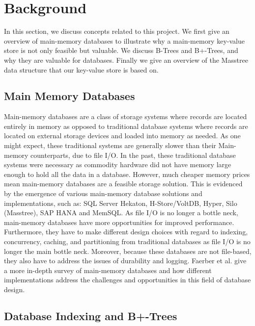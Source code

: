 \section{Background} \label{sec:Background}

In this section, we discuss concepts related to this project. We first give an overview of main-memory databases to illustrate why a main-memory key-value store is not only feasible but valuable. We discuss B-Trees and B+-Trees, and why they are valuable for databases. Finally we give an overview of the Masstree data structure that our key-value store is based on.

\subsection{Main Memory Databases} 
Main-memory databases are a class of storage systems where records are located entirely in memory as opposed to traditional database systems where records are located on external storage devices and loaded into memory as needed. As one might expect, these traditional systems are generally slower than their Main-memory counterparts, due to file I/O. In the past, these traditional database systems were necessary as commodity hardware did not have memory large enough to hold all the data in a database. However, much cheaper memory prices mean main-memory databases are a feasible storage solution. This is evidenced by the emergence of various main-memory database solutions and implementations, such as: SQL Server Hekaton, H-Store/VoltDB, Hyper, Silo (Masstree), SAP HANA and MemSQL. As file I/O is no longer a bottle neck, main-memory databases have more opportunities for improved performance. Furthermore, they have to make different design choices with regard to indexing, concurrency, caching, and partitioning from traditional databases as file I/O is no longer the main bottle neck. Moreover, because these databases are not file-based, they also have to address the issues of durability and logging. Faerber et al. \cite{main-mem-dbs} give a more in-depth survey of main-memory databases and how different implementations address the challenges and opportunities in this field of database design.

\subsection{Database Indexing and B+-Trees} \label{sec:indexB+-trees}

